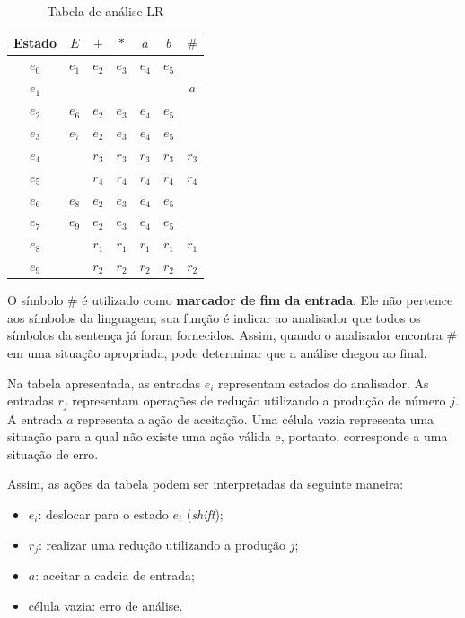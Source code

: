 \documentclass[
  brazilian,
  letterpaper,
]{book}
\providecommand{\tightlist}{%
  \setlength{\itemsep}{0pt}\setlength{\parskip}{0pt}}
\theoremstyle{plain}
\theoremstyle{definition}
\theoremstyle{remark}
\begin{document}
\begin{longtable}[]{|c|c|c|c|c|c|c|}

\caption{\label{tbl-analise-lr}Tabela de análise LR}

\tabularnewline

\toprule\noalign{}
Estado & \(E\) & \(+\) & \(*\) & \(a\) & \(b\) & \(\#\) \\
\midrule\noalign{}
\endhead
\bottomrule\noalign{}
\endlastfoot
\(e_0\) & \(e_1\) & \(e_2\) & \(e_3\) & \(e_4\) & \(e_5\) & \\
\midrule
\(e_1\) & & & & & & \(a\) \\
\midrule
\(e_2\) & \(e_6\) & \(e_2\) & \(e_3\) & \(e_4\) & \(e_5\) & \\
\midrule
\(e_3\) & \(e_7\) & \(e_2\) & \(e_3\) & \(e_4\) & \(e_5\) & \\
\midrule
\(e_4\) & & \(r_3\) & \(r_3\) & \(r_3\) & \(r_3\) & \(r_3\) \\
\midrule
\(e_5\) & & \(r_4\) & \(r_4\) & \(r_4\) & \(r_4\) & \(r_4\) \\
\midrule
\(e_6\) & \(e_8\) & \(e_2\) & \(e_3\) & \(e_4\) & \(e_5\) & \\
\midrule
\(e_7\) & \(e_9\) & \(e_2\) & \(e_3\) & \(e_4\) & \(e_5\) & \\
\midrule
\(e_8\) & & \(r_1\) & \(r_1\) & \(r_1\) & \(r_1\) & \(r_1\) \\
\midrule
\(e_9\) & & \(r_2\) & \(r_2\) & \(r_2\) & \(r_2\) & \(r_2\) \\

\end{longtable}

O símbolo \(\#\) é utilizado como \textbf{marcador de fim da entrada}.
Ele não pertence aos símbolos da linguagem; sua função é indicar ao
analisador que todos os símbolos da sentença já foram fornecidos. Assim,
quando o analisador encontra \(\#\) em uma situação apropriada, pode
determinar que a análise chegou ao final.

Na tabela apresentada, as entradas \(e_i\) representam estados do
analisador. As entradas \(r_j\) representam operações de redução
utilizando a produção de número \(j\). A entrada \(a\) representa a ação
de aceitação. Uma célula vazia representa uma situação para a qual não
existe uma ação válida e, portanto, corresponde a uma situação de erro.

Assim, as ações da tabela podem ser interpretadas da seguinte maneira:

\begin{itemize}
\tightlist
\item
  \(e_i\): deslocar para o estado \(e_i\) (\emph{shift});
\item
  \(r_j\): realizar uma redução utilizando a produção \(j\);
\item
  \(a\): aceitar a cadeia de entrada;
\item
  célula vazia: erro de análise.
\end{itemize}
\end{document}
